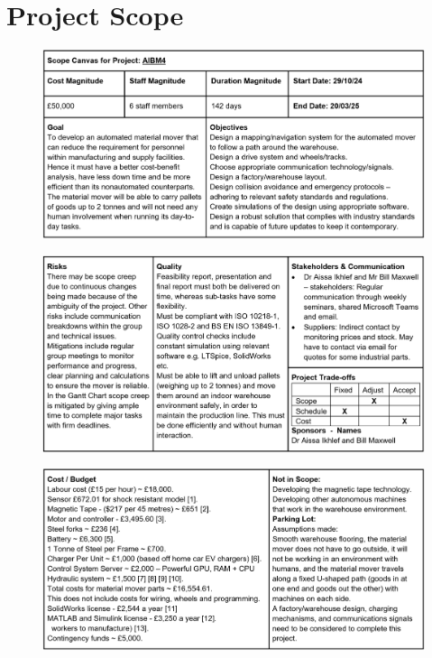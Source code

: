 \documentclass[12pt,titlepage]{article}
\begin{document}
\section{Project Scope}
\FloatBarrier
\vspace{-20pt}
\begin{figure}[H]
    \centering
    \includegraphics[width=1\linewidth]{ScopeCanvas1.png}
\end{figure}
\vspace{-3em}
\begin{figure}[H]
    \centering
    \includegraphics[width=1\linewidth]{ScopeCanvas2.png}
\end{figure}
\vspace{-40pt}
\begin{figure}[H]
     \centering
    \includegraphics[width=1\linewidth]{ScopeCanvas3.png}
 \end{figure}
\end{document}

